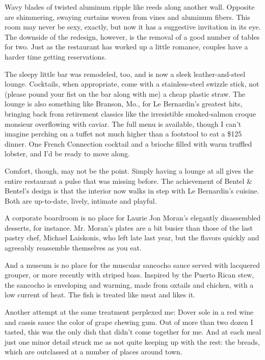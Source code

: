 Wavy blades of twisted aluminum ripple like reeds along another wall.
Opposite are shimmering, swaying curtains woven from vines and aluminum
fibers. This room may never be sexy, exactly, but now it has a
suggestive invitation in its eye. The downside of the redesign, however,
is the removal of a good number of tables for two. Just as the
restaurant has worked up a little romance, couples have a harder time
getting reservations.

The sleepy little bar was remodeled, too, and is now a sleek
leather-and-steel lounge. Cocktails, when appropriate, come with a
stainless-steel swizzle stick, not (please pound your fist on the bar
along with me) a cheap plastic straw. The lounge is also something like
Branson, Mo., for Le Bernardin's greatest hits, bringing back from
retirement classics like the irresistible smoked-salmon croque monsieur
overflowing with caviar. The full menu is available, though I can't
imagine perching on a tuffet not much higher than a footstool to eat a
\$125 dinner. One French Connection cocktail and a brioche filled with
warm truffled lobster, and I'd be ready to move along.

Comfort, though, may not be the point. Simply having a lounge at all
gives the entire restaurant a pulse that was missing before. The
achievement of Bentel \& Bentel's design is that the interior now walks
in step with Le Bernardin's cuisine. Both are up-to-date, lively,
intimate and playful.

A corporate boardroom is no place for Laurie Jon Moran's elegantly
disassembled desserts, for instance. Mr. Moran's plates are a bit busier
than those of the last pastry chef, Michael Laiskonis, who left late
last year, but the flavors quickly and agreeably reassemble themselves
as you eat.

And a museum is no place for the muscular sancocho sauce served with
lacquered grouper, or more recently with striped bass. Inspired by the
Puerto Rican stew, the sancocho is enveloping and warming, made from
oxtails and chicken, with a low current of heat. The fish is treated
like meat and likes it.

Another attempt at the same treatment perplexed me: Dover sole in a red
wine and cassis sauce the color of grape chewing gum. Out of more than
two dozen I tasted, this was the only dish that didn't come together for
me. And at each meal just one minor detail struck me as not quite
keeping up with the rest: the breads, which are outclassed at a number
of places around town.

